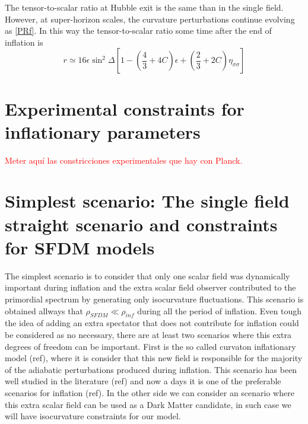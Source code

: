 \documentclass[twocolumn,           %
               showpacs,            %
               preprintnumbers,     %
               aps,                 %
               prl,          	    %
               letterpaper,             %
               superscriptaddress,      %
               nofootinbib,         %
               tightenlines,        %
               floats,floatfix      %
               ,usenatbib,
               ]{revtex4-1}
\begin{document}
The tensor-to-scalar ratio at Hubble exit is the same than in the single field. However, at super-horizon scales, the curvature perturbations continue evolving as \eqref{PRf}. In this way the tensor-to-scalar ratio some time after the end of inflation is
\begin{equation}\label{Tensortoscalar}
r\simeq 16\epsilon \sin^2\Delta\left[1-\left(\frac{4}{3}+4C\right)\epsilon +\left(\frac{2}{3}+2C\right)\eta_{\sigma\sigma}\right]
\end{equation}
\section{Experimental constraints for inflationary parameters}

\textcolor{red}{Meter aqu\'i las constricciones experimentales que hay con Planck.}

%
%
%
%
%
%
\section{Simplest scenario: The single field straight scenario and constraints for SFDM models}

The simplest scenario is to consider that only one scalar field was dynamically important during inflation and the extra scalar field observer contributed to the primordial spectrum by generating only isocurvature fluctuations. This scenario is obtained allways that $\rho_{SFDM}\ll \rho_{inf}$ during all the period of inflation. Even tough the idea of adding an extra spectator that does not contribute for inflation could be considered as no necessary, there are at least two scenarios where this extra degrees of freedom can be important. First is the so called curvaton inflationary model (ref), where it is consider that this new field is responsible for the majority of the adiabatic perturbations produced during inflation. This scenario has been well studied in the literature (ref) and now a days it is one of the preferable scenarios for inflation (ref). In the other side we can consider an scenario where this extra scalar field can be used as a Dark Matter candidate, in such case we will have isocurvature constraints for our model. 
\end{document}
